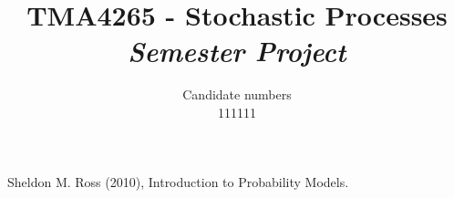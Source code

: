 \documentclass[11pt,a4paper,notitlepage,openright]{article}
\title{TMA4265 - Stochastic Processes\\
\vspace*{0.5cm}
\Large{\textit{Semester Project}}}
\author{Candidate numbers\\
111111}
\def\biblio{ %
\clearpage

\thispagestyle{empty}

}
\def\bibliosub{\biblio \listoftodos} %
\def\subtoc{\tableofcontents}
\begin{document}
\def\bibliosub{} %
\def\subtoc{}


\maketitle  %

\setcounter{page}{1}    %
\pagestyle{plain}

%




\pagestyle{fancy}

\setlength{\headheight}{15pt}
\fancyhf{}
\fancyhead[LE,RO]{\thepage}
\fancyhead[RE]{\textit{{\leftmark}}}
\fancyhead[LO]{\textit{\nouppercase{\rightmark}}}
 
\setcounter{page}{1}    %

\setlength{\headheight}{15pt}





\begin{thebibliography}{00}
 Sheldon M. Ross (2010), Introduction to Probability Models.
\end{thebibliography}

\thispagestyle{empty}
\pagebreak

\appendix
\setcounter{page}{1}
\pagestyle{fancy}
\fancyhf{}
\cfoot{\thepage}
\renewcommand{\headrulewidth}{0pt}
\renewcommand{\footrulewidth}{0pt}




%
%

\listoftodos
\end{document}
